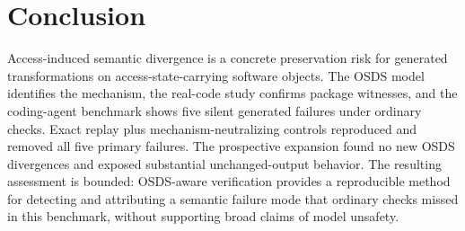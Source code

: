 \section{Conclusion}

Access-induced semantic divergence is a concrete preservation risk for generated transformations on access-state-carrying software objects. The OSDS model identifies the mechanism, the real-code study confirms package witnesses, and the coding-agent benchmark shows five silent generated failures under ordinary checks. Exact replay plus mechanism-neutralizing controls reproduced and removed all five primary failures. The prospective expansion found no new OSDS divergences and exposed substantial unchanged-output behavior. The resulting assessment is bounded: OSDS-aware verification provides a reproducible method for detecting and attributing a semantic failure mode that ordinary checks missed in this benchmark, without supporting broad claims of model unsafety.
